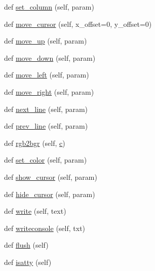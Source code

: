 \begin{DoxyCompactItemize}
\item 
def \hyperlink{classwaflib_1_1ansiterm_1_1_ansi_term_acd65956a7d56681cc669acca5bdd43fb}{set\+\_\+column} (self, param)
\item 
def \hyperlink{classwaflib_1_1ansiterm_1_1_ansi_term_ade95c6eb1c7ed7928780aad4e6b4e268}{move\+\_\+cursor} (self, x\+\_\+offset=0, y\+\_\+offset=0)
\item 
def \hyperlink{classwaflib_1_1ansiterm_1_1_ansi_term_a7725bd9ed185458669ad7601fb7ff9d9}{move\+\_\+up} (self, param)
\item 
def \hyperlink{classwaflib_1_1ansiterm_1_1_ansi_term_a7b2ea0403457b7cd8d0ac4088064d812}{move\+\_\+down} (self, param)
\item 
def \hyperlink{classwaflib_1_1ansiterm_1_1_ansi_term_a617dda0ced0a3e3f3443366d4a1c46bb}{move\+\_\+left} (self, param)
\item 
def \hyperlink{classwaflib_1_1ansiterm_1_1_ansi_term_a1388984c5cb5051d6c48682d1cd998b7}{move\+\_\+right} (self, param)
\item 
def \hyperlink{classwaflib_1_1ansiterm_1_1_ansi_term_a8ce79cf478dc1bf0cec2c12e28103522}{next\+\_\+line} (self, param)
\item 
def \hyperlink{classwaflib_1_1ansiterm_1_1_ansi_term_ac65f3453904e9c561f530b7c43e73f12}{prev\+\_\+line} (self, param)
\item 
def \hyperlink{classwaflib_1_1ansiterm_1_1_ansi_term_ad097d16ecb1babcef5970faccad1e7e9}{rgb2bgr} (self, \hyperlink{rfft2d_test_m_l_8m_ae0323a9039add2978bf5b49550572c7c}{c})
\item 
def \hyperlink{classwaflib_1_1ansiterm_1_1_ansi_term_a2b56ee3c8294f7e2e5bca7cc60e8ee05}{set\+\_\+color} (self, param)
\item 
def \hyperlink{classwaflib_1_1ansiterm_1_1_ansi_term_a594f6cf62d5e4ca33f2b88127fd6393d}{show\+\_\+cursor} (self, param)
\item 
def \hyperlink{classwaflib_1_1ansiterm_1_1_ansi_term_a2ca4bde33edd4afa92c8bda3f01d1dc9}{hide\+\_\+cursor} (self, param)
\item 
def \hyperlink{classwaflib_1_1ansiterm_1_1_ansi_term_a03ecdf1c9e54a69800aae320175c281b}{write} (self, text)
\item 
def \hyperlink{classwaflib_1_1ansiterm_1_1_ansi_term_a8296f875a3fd0a03fc109073f2a73a3e}{writeconsole} (self, txt)
\item 
def \hyperlink{classwaflib_1_1ansiterm_1_1_ansi_term_a08667242c11cdfd8b74d64f8191d4938}{flush} (self)
\item 
def \hyperlink{classwaflib_1_1ansiterm_1_1_ansi_term_a08e698612e76adc1aa3e26cdc5cb2009}{isatty} (self)

\end{DoxyCompactItemize}
